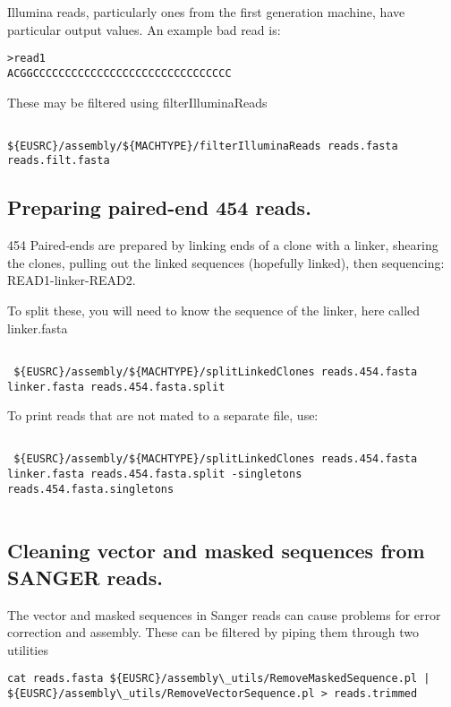 \documentclass{article}[12pt]
\begin{document}
	Illumina reads, particularly ones from the first generation machine,
	have particular output values.  An example bad read is:

\begin{verbatim}
>read1
ACGGCCCCCCCCCCCCCCCCCCCCCCCCCCCCCCC
\end{verbatim}

  These may be filtered using filterIlluminaReads

\begin{verbatim}

${EUSRC}/assembly/${MACHTYPE}/filterIlluminaReads reads.fasta reads.filt.fasta
\end{verbatim}

\subsection{Preparing paired-end 454 reads.}

454 Paired-ends are prepared by linking ends of a clone with a
 linker, shearing the clones, pulling out the linked sequences
 (hopefully linked), then sequencing: READ1-linker-READ2.  

 To split these, you will need to know the sequence of the linker,
 here called linker.fasta
\begin{verbatim}

 ${EUSRC}/assembly/${MACHTYPE}/splitLinkedClones reads.454.fasta linker.fasta reads.454.fasta.split

\end{verbatim}

 To print reads that are not mated to a separate file, use:
\begin{verbatim}

 ${EUSRC}/assembly/${MACHTYPE}/splitLinkedClones reads.454.fasta linker.fasta reads.454.fasta.split -singletons reads.454.fasta.singletons
 
\end{verbatim}
 

\subsection{ Cleaning vector and masked sequences from SANGER reads.}

		 The vector and masked sequences in Sanger reads can cause
	   problems for error correction and assembly.  These can be
	   filtered by piping them through two utilities

\begin{verbatim}
cat reads.fasta ${EUSRC}/assembly\_utils/RemoveMaskedSequence.pl |
${EUSRC}/assembly\_utils/RemoveVectorSequence.pl > reads.trimmed
\end{verbatim}
\end{document}
